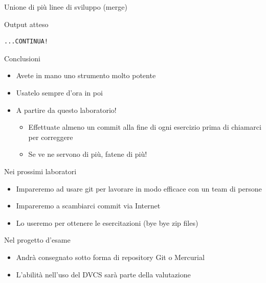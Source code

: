 \documentclass[xcolor=dvipsnames,presentation]{beamer}
\begin{document}
\begin{frame}{Unione di più linee di sviluppo (merge)}
\begin{block}{Output atteso}
\begin{Verbatim}[fontsize=\tiny]
...CONTINUA!
        \end{Verbatim}
    \end{block}
\end{frame}

\begin{frame}{Conclusioni}
    \begin{itemize}
        \item Avete in mano uno strumento molto potente
        \item Usatelo sempre d'ora in poi
        \item A partire da questo laboratorio!
        \begin{itemize}
            \item Effettuate almeno un commit alla fine di ogni esercizio prima di chiamarci per correggere
            \item Se ve ne servono di più, fatene di più!
        \end{itemize}
    \end{itemize}
    \begin{block}{Nei prossimi laboratori}
        \begin{itemize}
            \item Impareremo ad usare git per lavorare in modo efficace con un team di persone
            \item Impareremo a scambiarci commit via Internet
            \item Lo useremo per ottenere le esercitazioni (bye bye zip files)
        \end{itemize}
    \end{block}
    \begin{block}{Nel progetto d'esame}
        \begin{itemize}
            \item Andrà consegnato sotto forma di repository Git o Mercurial
            \item L'abilità nell'uso del DVCS sarà parte della valutazione
        \end{itemize}
    \end{block}
\end{frame}
\end{document}
